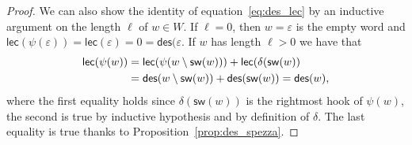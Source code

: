 \documentclass[10pt,a4paper]{amsart}
\newcommand{\des}{\mathsf{des}}
\newcommand{\lec}{\mathsf{lec}}
\newcommand{\sw}{\mathsf{sw}}
\theoremstyle{definition}
\theoremstyle{remark}
\numberwithin{equation}{section}
\begin{document}
\begin{proof}
We can also show the identity of equation~\eqref{eq:des_lec} by an inductive argument on the length $\ell$ of $w\in W$. If $\ell=0$, then $w=\varepsilon$ is the empty word and $\lec(\psi(\varepsilon))=\lec(\varepsilon)=0=\des(\varepsilon$. If $w$ has length $\ell>0$ we have that
\begin{align}
    \lec(\psi(w))&=\lec(\psi(w\setminus\sw(w)))+\lec(\delta(\sw(w))\notag\\
    &=\des(w\setminus\sw(w))+\des(\sw(w))=\des(w),
\end{align}
where the first equality holds since $\delta(\sw(w))$ is the rightmost hook of $\psi(w)$, the second is true by inductive hypothesis and by definition of $\delta$. The last equality is true thanks to Proposition~\ref{prop:des_spezza}.
\end{proof}
\end{document}
